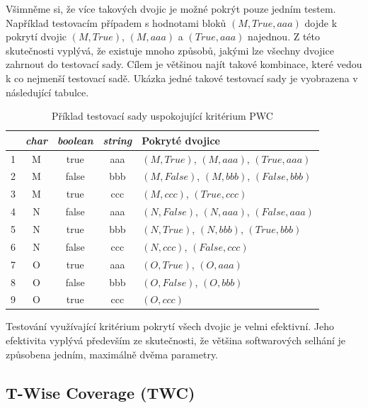Všimněme si, že více takových dvojic je možné pokrýt pouze jedním testem. Například testovacím případem s hodnotami bloků $(M,True,aaa)$ dojde k pokrytí dvojic $(M,True)$, $(M, aaa)$ a $(True,aaa)$ najednou. Z této skutečnosti vyplývá, že existuje mnoho způsobů, jakými lze všechny dvojice zahrnout do testovací sady. Cílem je většinou najít takové kombinace, které vedou k co nejmenší testovací sadě. Ukázka jedné takové testovací sady je vyobrazena v následující tabulce.

\begin{table}[h!]
\centering
\begin{tabular}{ |c|c c c|l| } 
 \hline
 & \textit{char} & \textit{boolean} & \textit{string} & Pokryté dvojice \\
 \hline
1 & M & true & aaa & $(M, True)$, $(M, aaa)$, $(True, aaa)$ \\
2 & M & false & bbb & $(M, False)$, $(M, bbb)$, $(False,bbb)$ \\
3 & M & true & ccc & $(M, ccc)$, $(True, ccc)$ \\
4 & N & false & aaa & $(N, False)$, $(N, aaa)$, $(False, aaa)$\\
5 & N & true & bbb & $(N, True)$, $(N, bbb)$, $(True, bbb)$ \\
6 & N & false & ccc & $(N, ccc)$, $(False,ccc)$ \\
7 & O & true & aaa & $(O, True)$, $(O, aaa)$ \\
8 & O & false & bbb & $(O, False)$, $(O, bbb)$\\
9 & O & true & ccc & $(O, ccc)$  \\
 \hline
\end{tabular}
\caption{Příklad testovací sady uspokojující kritérium PWC}
\label{table_resultpwc}
\end{table}

Testování využívající kritérium pokrytí všech dvojic je velmi efektivní. Jeho efektivita vyplývá především ze skutečnosti, že většina softwarových selhání je způsobena jedním, maximálně dvěma parametry.



\subsection*{T-Wise Coverage (TWC)}
\label{subsec_twc}

